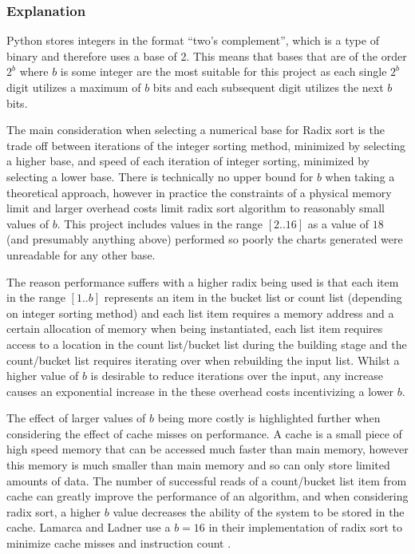\documentclass[12pt]{article}
\begin{document}
	\subsubsection{Explanation}
	\label{ssec:radixexplanation}
	Python stores integers in the format ``two's complement”, which is a type of binary and therefore uses a base of 2. This means that bases that are of the order $2^b$ where $b$ is some integer are the most suitable for this project as each single $2^b$ digit utilizes a maximum of $b$ bits and each subsequent digit utilizes the next $b$ bits.
	\par
	The main consideration when selecting a numerical base for Radix sort is the trade off between iterations of the integer sorting method, minimized by selecting a higher base, and speed of each iteration of integer sorting, minimized by selecting a lower base. There is technically no upper bound for $b$ when taking a theoretical approach, however in practice the constraints of a physical memory limit and larger overhead costs limit radix sort algorithm to reasonably small values of $b$. This project includes values in the range $[2..16]$ as a value of $18$ (and presumably anything above) performed so poorly the charts generated were unreadable for any other base.
	\par 
	The reason performance suffers with a higher radix being used is that each item in the range $[1..b]$ represents an item in the bucket list or count list (depending on integer sorting method) and each list item requires a memory address and a certain allocation of memory when being instantiated, each list item requires access to a location in the count list/bucket list during the building stage and the count/bucket list requires iterating over when rebuilding the input list. Whilst a higher value of $b$ is desirable to reduce iterations over the input, any increase causes an exponential increase in the these overhead costs incentivizing a lower $b$. 
	\par 
	The effect of larger values of $b$ being more costly is highlighted further when considering the effect of cache misses on performance. A cache is a small piece of high speed memory that can be accessed much faster than main memory, however this memory is much smaller than main memory and so can only store limited amounts of data. The number of successful reads of a count/bucket list item from cache can greatly improve the performance of an algorithm, and when considering radix sort, a higher $b$ value decreases the ability of the system to be stored in the cache. Lamarca and Ladner use a $b = 16$ in their implementation of radix sort to minimize cache misses and instruction count \cite{LAMARCA199966}.
\end{document}
